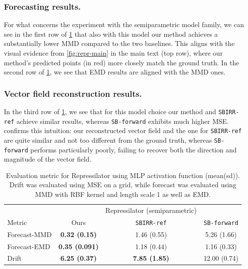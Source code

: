 \subsubsection{Forecasting results.}
\label{app:repr-forecasting-semiparametric}
For what concerns the experiment with the semiparametric model family, we can see in the first row of \cref{tab:repr-mlp} that also with this model our method achieves a substantially lower MMD compared to the two baselines. This aligns with the visual evidence from \cref{fig:repr-main} in the main text (top row), where our method’s predicted points (in red) more closely match the ground truth. In the second row of \cref{tab:repr-mlp}, we see that EMD results are aligned with the MMD ones. 

\subsubsection{Vector field reconstruction results.}
\label{app:repr-vector-semiparametric}

In the third row of \cref{tab:repr-mlp}, we see that for this model choice our method and \texttt{SBIRR-ref} achieve similar results, whereas \texttt{SB-forward} exhibits much higher MSE.  confirms this intuition: our reconstructed vector field and the one for \texttt{SBIRR-ref} are quite similar and not too different from the ground truth, whereas \texttt{SB-forward} performs particularly poorly, failing to recover both the direction and magnitude of the vector field. 

\begin{table}[ht!]
    \centering
    \caption{Evaluation metric for Repressilator using MLP activation function (mean(sd)). Drift was evaluated using MSE on a grid, while forecast was evaluated using MMD with RBF kernel and length scale 1 as well as EMD.}
    \begin{tabular}{lccc}
    \hline
    &     & Repressilator (semiparametric) & \\
    Metric     &  Ours & \texttt{SBIRR-ref} & \texttt{SB-forward} \\
    \hline
    Forecast-MMD & \cellcolor{green!25}\textbf{0.32 (0.15)}& 1.46 (0.55) & 5.26 (1.66) \\
    Forecast-EMD & \cellcolor{green!25}\textbf{0.35 (0.091)}& 1.18 (0.44) & 1.16 (0.33) \\
    Drift & \cellcolor{green!25}\textbf{6.25 (0.37)} & \cellcolor{green!25}\textbf{7.85 (1.85)} & 12.00 (0.74)  \\
    \hline
    \end{tabular}
    \label{tab:repr-mlp}
\end{table}


